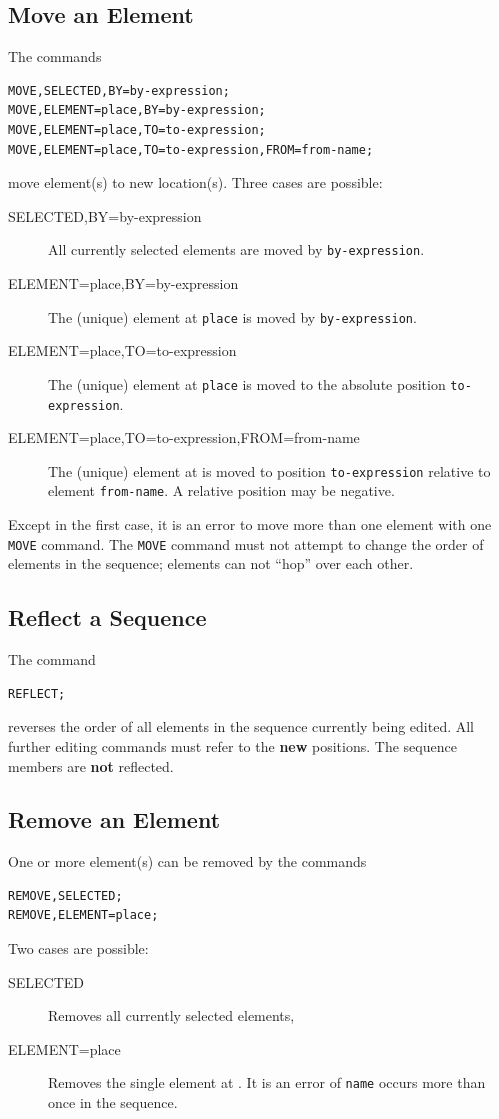 \subsection{Move an Element}
\label{sec:editmove}
The commands
\begin{verbatim}
MOVE,SELECTED,BY=by-expression;
MOVE,ELEMENT=place,BY=by-expression;
MOVE,ELEMENT=place,TO=to-expression;
MOVE,ELEMENT=place,TO=to-expression,FROM=from-name;
\end{verbatim}
move element(s) to new location(s).
Three cases are possible:
\begin{description}
\item[SELECTED,BY=by-expression]
  All currently selected elements are moved by \texttt{by-expression}.
\item[ELEMENT=place,BY=by-expression]
  The (unique) element at \texttt{place} is moved by \texttt{by-expression}.
\item[ELEMENT=place,TO=to-expression]
  The (unique) element at \texttt{place} is moved to the absolute position 
  \texttt{to-expression}.
\item[ELEMENT=place,TO=to-expression,FROM=from-name]
  The (unique) element at  is moved to
  position \texttt{to-expression} relative to element
  \texttt{from-name}.  A relative position may be negative.
\end{description}
Except in the first case, it is an error to move more than one element
with one \texttt{MOVE} command.
The \texttt{MOVE} command must not attempt to change the order of
elements in the sequence;
elements can not ``hop'' over each other.

\subsection{Reflect a Sequence}
\label{sec:editreflect}
The command
\begin{verbatim}
REFLECT;
\end{verbatim}
reverses the order of all elements in the sequence currently being
edited.
All further editing commands must refer to the \textbf{new} positions.
The sequence members are \textbf{not} reflected.

\subsection{Remove an Element}
\label{sec:editremove}
One or more element(s) can be removed by the commands
\begin{verbatim}
REMOVE,SELECTED;
REMOVE,ELEMENT=place;
\end{verbatim}
Two cases are possible:
\begin{description}
\item[SELECTED]
  Removes all currently selected elements,
\item[ELEMENT=place]
  Removes the single element at .
  It is an error of \texttt{name} occurs more than once in the sequence.
\end{description}


